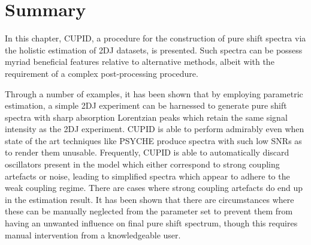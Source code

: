 \section{Summary}
In this chapter, \ac{CUPID}, a procedure for the construction of pure shift
spectra via the holistic estimation of \ac{2DJ} datasets, is presented.
Such spectra can be possess myriad beneficial features relative to alternative
methods, albeit with the requirement of a complex post-processing procedure.



Through a number of examples, it has been shown that by employing parametric
estimation, a simple \ac{2DJ} experiment can be harnessed to generate pure
shift spectra with sharp absorption Lorentzian peaks which retain the same
signal intensity as the \ac{2DJ} experiment. \ac{CUPID} is able to perform
admirably even when state of the art techniques like \ac{PSYCHE} produce
spectra with such low \acp{SNR} as to render them unusable. Frequently, \ac{CUPID}
is able to automatically discard oscillators present in the model which either
correspond to strong coupling artefacts or noise, leading to simplified spectra
which appear to adhere to the weak coupling regime. There are cases where
strong coupling artefacts do end up in the estimation result. It has been shown
that there are circumstances where these can be manually neglected from the
parameter set to prevent them from having an unwanted influence on final pure
shift spectrum, though this requires manual intervention from a knowledgeable
user.

